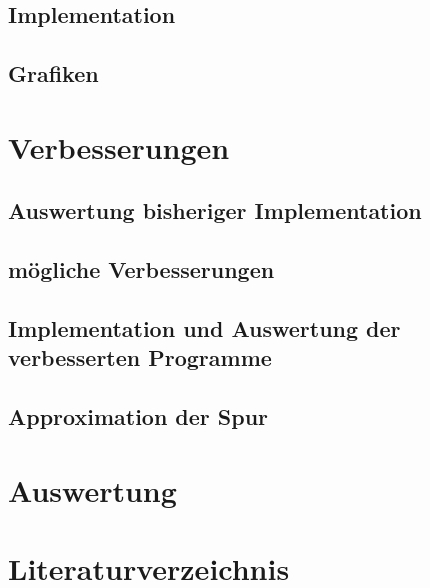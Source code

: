 \documentclass[a4paper,12pt]{report}
\theoremstyle{plain} %
\theoremstyle{definition} %
\theoremstyle{remark}
\begin{document}
      \section{Implementation}

      \section{Grafiken}

\chapter{Verbesserungen}
\label{sec: Verbesserungen}
      \section{Auswertung bisheriger Implementation}

      \section{mögliche Verbesserungen}

      \section{Implementation und Auswertung der verbesserten Programme}

      \section{Approximation der Spur}

\chapter{Auswertung}
\label{sec: Auswertung}

\chapter{Literaturverzeichnis}

\end{document}
